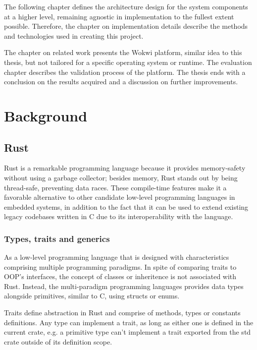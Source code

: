 \documentclass[12pt,a4paper]{report}
\begin{document}
The following chapter defines the architecture design for the system components at a higher level, remaining agnostic in implementation to the fullest extent possible. Therefore, the chapter on implementation details describe the methods and technologies used in creating this project. 

The chapter on related work presents the Wokwi platform, similar idea to this thesis, but not tailored for a specific operating system or runtime. The evaluation chapter describes the validation process of the platform. 
The thesis ends with a conclusion on the results acquired and a discussion on further improvements.

\chapter{Background}\pagestyle{fancy}

\section{Rust}

Rust is a remarkable programming language because it provides memory-safety without using a garbage collector; besides memory, Rust stands out by being thread-safe, preventing data races. These compile-time features make it a favorable alternative to other candidate low-level programming languages in embedded systems, in addition to the fact that it can be used to extend existing legacy codebases written in C due to its interoperability with the language. 

\subsection{Types, traits and generics}

As a low-level programming language that is designed with characteristics comprising multiple programming paradigms. In spite of comparing traits to OOP's interfaces, the concept of classes or inheritence is not associated with Rust. Instead, the multi-paradigm programming languages provides data types alongside primitives, similar to C, using structs or enums.

Traits define abstraction in Rust and comprise of methods, types or constants definitions. Any type can implement a trait, as long as either one is defined in the current crate, e.g. a primitive type can't implement a trait exported from the std crate outside of its definition scope.
\end{document}
